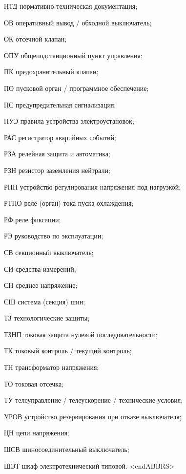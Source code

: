 \begin{list}{}
\item[НТД] нормативно-техническая документация;
\item[ОВ] оперативный вывод / обходной выключатель;
\item[ОК] отсечной клапан;
\item[ОПУ] общеподстанционный пункт управления;
\item[ПК] предохранительный клапан;
\item[ПО] пусковой орган / программное обеспечение;
\item[ПС] предупредительная сигнализация;
\item[ПУЭ] правила устройства электроустановок;
\item[РАС] регистратор аварийных событий;
\item[РЗА] релейная защита и автоматика;
\item[РЗН] резистор заземления нейтрали;
\item[РПН] устройство регулирования напряжения под нагрузкой;
\item[РТПО] реле (орган) тока пуска охлаждения;
\item[РФ] реле фиксации;
\item[РЭ] руководство по эксплуатации;
\item[СВ] секционный выключатель;
\item[СИ] средства измерений;
\item[СН] среднее напряжение;
\item[СШ] система (секция) шин;
\item[ТЗ] технологические защиты;
\item[ТЗНП] токовая защита нулевой последовательности;
\item[ТК] токовый контроль / текущий контроль;
\item[ТН] трансформатор напряжения;
\item[ТО] токовая отсечка;
\item[ТУ] телеуправление / телеускорение / технические условия;
\item[УРОВ] устройство резервирования при отказе выключателя;
\item[ЦН] цепи напряжения;
\item[ШСВ] шиносоединительный выключатель;
\item[ШЭТ] шкаф электротехнический типовой.
{\color{white}\fontsize{0.1pt}{0.1pt}\selectfont<endABBRS>}
\end{list}
